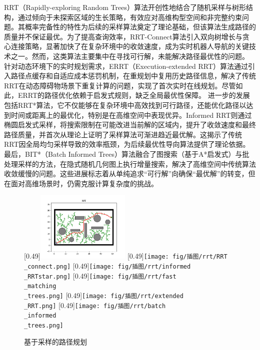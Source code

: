 \documentclass[master,academic]{ysuthesis} %
\begin{document}
		RRT（Rapidly-exploring Random Trees）算法\cite{lavalle1998rapidly}开创性地结合了随机采样与树形结构，通过倾向于未探索区域的生长策略，有效应对高维构型空间和非完整约束问题。其概率完备性的特性为后续的采样算法奠定了理论基础，但该算法生成路径的质量并不保证最优。为了提高查询效率，RRT-Connect算法\cite{kuffner2000rrt}引入双向树增长与贪心连接策略，显著加快了在复杂环境中的收敛速度，成为实时机器人导航的关键技术之一。然而，这类算法主要集中在寻找可行解，未能解决路径最优性的问题。
		针对动态环境下的实时规划需求，ERRT（Execution-extended RRT）算法\cite{bruce2002real}通过引入路径点缓存和自适应成本惩罚机制，在重规划中复用历史路径信息，解决了传统RRT在动态障碍物场景下重复计算的问题，实现了首次实时在线规划。尽管如此，ERRT的路径优化依赖于启发式规则，缺乏全局最优性保障。
		进一步的发展包括RRT*算法\cite{karaman2011sampling}，它不仅能够在复杂环境中高效找到可行路径，还能优化路径以达到时间或距离上的最优化，特别是在高维空间中表现优异。Informed RRT\cite{6942976}则通过椭圆启发式采样，将搜索限制在可能改进当前解的区域内，提升了收敛速度和最终路径质量，并首次从理论上证明了采样算法可渐进趋近最优解。这揭示了传统RRT因全局均匀采样导致的效率瓶颈，为后续最优性导向算法提供了理论依据。
		最后，BIT*（Batch Informed Trees）算法\cite{7139620}融合了图搜索（基于A*启发式）与批处理采样的方法，在隐式随机几何图上执行增量搜索，解决了高维空间中传统算法收敛缓慢的问题。这些进展标志着从单纯追求“可行解”向确保“最优解”的转变，但在面对高维场景时，仍需克服计算复杂度的挑战。
		\begin{figure}[!ht]
			\centering
			[0.49\textwidth]{\includegraphics[width=0.4\textwidth]{fig/插图/rrt/RRT.png}}
			[0.49\textwidth]{\texttt{[image: fig/插图/rrt/RRT\\\_connect.png]}}
			[0.49\textwidth]{\texttt{[image: fig/插图/rrt/informed\\\_RRTstar.png]}}
			[0.49\textwidth]{\texttt{[image: fig/插图/rrt/fast\\\_matching\\\_trees.png]}}
			[0.49\textwidth]{\texttt{[image: fig/插图/rrt/extended\\\_RRT.png]}}
			[0.49\textwidth]{\texttt{[image: fig/插图/rrt/batch\\\_informed\\\_trees.png]}}
			\caption{基于采样的路径规划}
			\label{fig:基于采样的路径规划}
		\end{figure}
\end{document}
